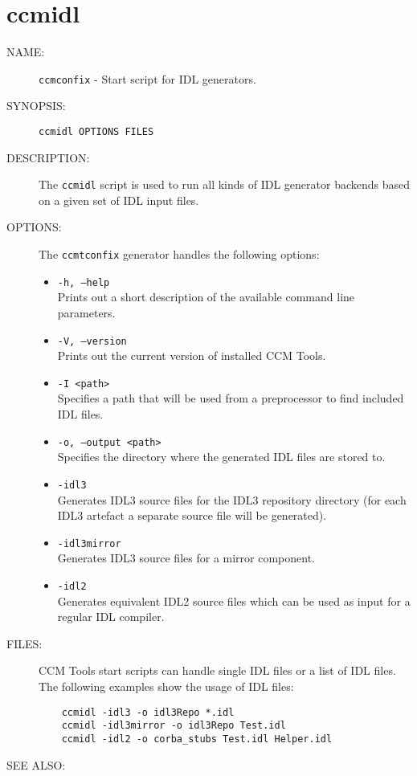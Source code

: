 \section{ccmidl}
\begin{description}
\item [NAME:] 
  {\tt ccmconfix} - Start script for IDL generators.

\item [SYNOPSIS:] 
  {\tt ccmidl OPTIONS FILES}

\item [DESCRIPTION:]
The {\tt ccmidl} script is used to run all kinds of IDL generator backends based
on a given set of IDL input files. 

\item [OPTIONS:]
  The {\tt ccmtconfix} generator handles the following options:
  \begin{itemize}
  \item {\tt -h, --help} \\
    Prints out a short description of the available command line parameters.

  \item {\tt -V, --version} \\
    Prints out the current version of installed CCM Tools.

  \item {\tt -I <path>} \\
    Specifies a path that will be used from a preprocessor to find 
    included IDL files.
  
  \item {\tt -o, --output <path> } \\
    Specifies the directory where the generated IDL files are stored to.

  \item {\tt -idl3 } \\
	Generates IDL3 source files for the IDL3 repository directory (for each IDL3
	artefact a separate source file will be generated).

  \item {\tt -idl3mirror } \\
  	Generates IDL3 source files for a mirror component.
  
  \item {\tt -idl2 } \\
  	Generates equivalent IDL2 source files which can be used as input for a
  	regular IDL compiler.
  \end{itemize}
    
  \item [FILES:]
  CCM Tools start scripts can handle single IDL files or a list of IDL
  files. The following examples show the usage of IDL files: 
  \begin{verbatim}
    ccmidl -idl3 -o idl3Repo *.idl
    ccmidl -idl3mirror -o idl3Repo Test.idl
    ccmidl -idl2 -o corba_stubs Test.idl Helper.idl 
  \end{verbatim}  
  
\item [SEE ALSO:]
\end{description}




